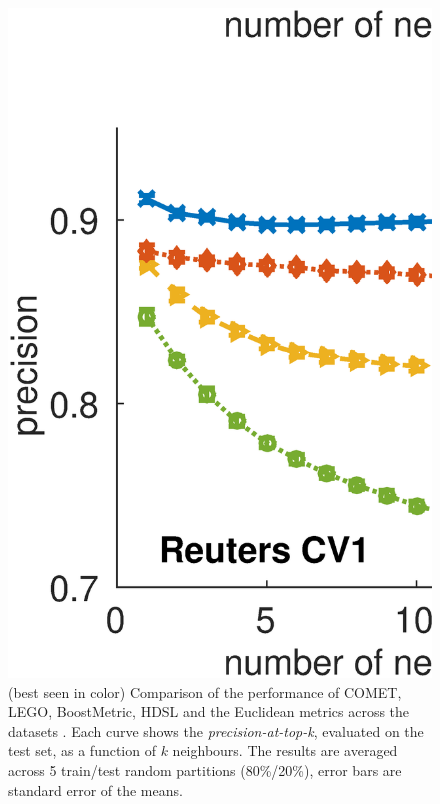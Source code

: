 \documentclass{article}
\begin{document}
\begin{figure}[h]
\vskip 0.2in
\begin{center}
\centerline{\includegraphics[width=\columnwidth]{Precision_at_K_all_datasets}}
\caption{ (best seen in color) Comparison of the performance of COMET, LEGO, BoostMetric, HDSL and the Euclidean metrics across the datasets . Each curve shows the \textit{precision-at-top-k}, evaluated on the test set, as a function of $k$ neighbours. The results are averaged across 5 train/test random partitions (80\%/20\%), error bars are standard error of the means.}
\label{precFig}
\end{center}
\vskip -0.2in
\end{figure} 
\end{document}
